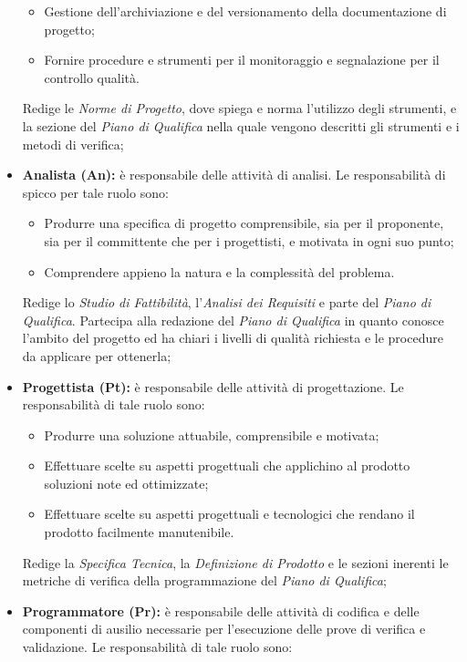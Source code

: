 \begin{itemize}
\begin{itemize}
				\item Gestione dell'archiviazione e del versionamento della documentazione di progetto;
				\item Fornire procedure e strumenti per il monitoraggio e segnalazione per il controllo
qualità. \\
			\end{itemize}
			Redige le \textit{Norme di Progetto}, dove spiega e norma l'utilizzo degli strumenti, e la sezione del \textit{Piano di Qualifica} nella quale vengono descritti gli strumenti e i metodi di verifica;
			\item \textbf{Analista (An):} è responsabile delle attività di analisi. Le responsabilità di spicco per tale ruolo sono: \\
			\begin{itemize}
				\item Produrre una specifica di progetto comprensibile, sia per il proponente, sia per il committente che per i progettisti, e motivata in ogni suo punto;
				\item  Comprendere appieno la natura e la complessità del problema. \\
			\end{itemize}
			Redige lo \textit{Studio di Fattibilità}, l'\textit{Analisi dei Requisiti} e parte del \textit{Piano di Qualifica}. Partecipa alla redazione del \textit{Piano di Qualifica} in quanto conosce l'ambito del progetto ed ha chiari i livelli di qualità richiesta e le procedure da applicare per ottenerla;
			\item \textbf{Progettista (Pt):} è responsabile delle attività di progettazione.
Le responsabilità di tale ruolo sono: \\
			\begin{itemize}
				\item Produrre una soluzione attuabile, comprensibile e motivata;
				\item Effettuare scelte su aspetti progettuali che applichino al prodotto soluzioni
note ed ottimizzate;
				\item Effettuare scelte su aspetti progettuali e tecnologici che rendano il prodotto
facilmente manutenibile. \\
			\end{itemize}
			Redige la \textit{Specifica Tecnica}, la \textit{Definizione di Prodotto} e le sezioni inerenti le metriche di verifica della programmazione del \textit{Piano di Qualifica};
			\item \textbf{Programmatore (Pr):} è responsabile delle attività di codifica e delle componenti di ausilio necessarie per l'esecuzione delle prove di verifica e validazione. Le responsabilità di tale ruolo sono: \\

\end{itemize}
